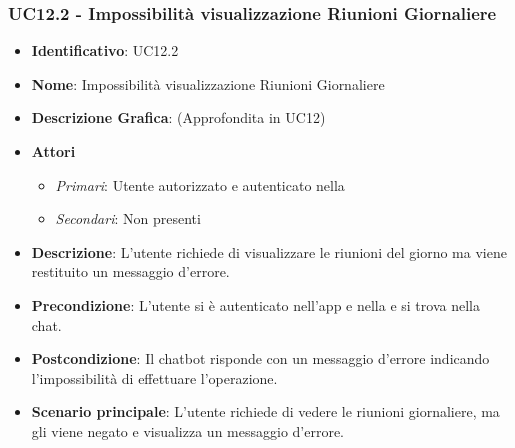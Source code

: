 \subsubsection{UC12.2 - Impossibilità visualizzazione Riunioni Giornaliere }
\begin{itemize}
	\item \textbf{Identificativo}: UC12.2
	\item \textbf{Nome}: Impossibilità visualizzazione Riunioni Giornaliere
	\item\textbf{Descrizione Grafica}: (Approfondita in UC12)
	\item \textbf{Attori}
	\begin{itemize} 
		\item \textit{Primari}: Utente autorizzato e autenticato nella 
		\item \textit{Secondari}: Non presenti
	\end{itemize}
	\item \textbf{Descrizione}: L'utente richiede di visualizzare le riunioni del giorno ma viene restituito un messaggio d'errore.
	\item \textbf{Precondizione}: L'utente si è autenticato nell'app e nella  e si trova nella chat.
	\item \textbf{Postcondizione}: Il chatbot risponde con un messaggio d'errore indicando l'impossibilità di effettuare l'operazione.
	\item \textbf{Scenario principale}: L'utente richiede di vedere le riunioni giornaliere, ma gli viene negato e visualizza un messaggio d'errore.
\end{itemize}